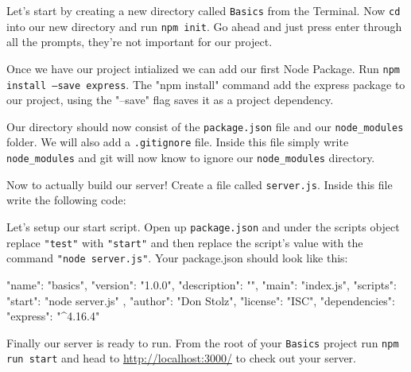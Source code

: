 \documentclass{42-en}
\begin{document}
	Let's start by creating a new directory called \texttt{Basics} from the Terminal. Now \texttt{cd} into our new directory and run \texttt{npm init}. Go ahead and just press enter through all the prompts, they're not important for our project.

	Once we have our project intialized we can add our first Node Package. Run \texttt{npm install --save express}. The "npm install" command add the express package to our project, using the "--save" flag saves it as a project dependency.
	
	Our directory should now consist of the \texttt{package.json} file and our \texttt{node\_modules} folder. We will also add a \texttt{.gitignore} file. Inside this file simply write \texttt{node\_modules} and git will now know to ignore our \texttt{node\_modules} directory.
	
	Now to actually build our server! Create a file called \texttt{server.js}. Inside this file write the following code:
	


\newpage
	Let's setup our start script. Open up \texttt{package.json} and under the scripts object replace \texttt{"test"} with \texttt{"start"} and then replace the script's value with the command \texttt{"node server.js"}. Your package.json should look like this:

\begin{42jscode}
{
    "name": "basics",
    "version": "1.0.0",
    "description": "",
    "main": "index.js",
    "scripts": {
        "start": "node server.js"
    },
    "author": "Don Stolz",
    "license": "ISC",
    "dependencies": {
        "express": "^4.16.4"
    }
}
\end{42jscode}

	Finally our server is ready to run. From the root of your \texttt{Basics} project run \texttt{npm run start} and head to \href{http://localhost:3000/}{http://localhost:3000/} to check out your server.
\end{document}
